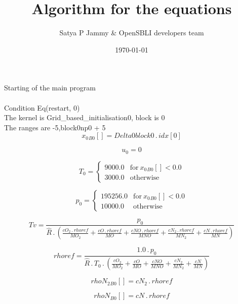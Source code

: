 \documentclass{article}
\title{Algorithm for the equations}
\author{Satya P Jammy \& OpenSBLI developers team}
\date{\today}
\begin{document}
\maketitle
\noindent Starting of the main program\\
\\\noindent Condition Eq(restart, 0)\\\noindent The kernel is Grid_based_initialisation0, block is 0\\\noindent The ranges are -5,block0np0 + 5\\\begin{dmath}{x_{0}{_{B0}}}[{}] = Delta0block0 \,.\, {idx}[{0}]\end{dmath}

\begin{dmath}u_{0} = 0\end{dmath}

\begin{dmath}T_{0} = \begin{cases} 9000.0 & \text{for}\: {x_{0}{_{B0}}}[{}] < 0.0 \\3000.0 & \text{otherwise} \end{cases}\end{dmath}

\begin{dmath}p_{0} = \begin{cases} 195256.0 & \text{for}\: {x_{0}{_{B0}}}[{}] < 0.0 \\10000.0 & \text{otherwise} \end{cases}\end{dmath}

\begin{dmath}Tv = \frac{p_{0}}{\hat{R} \,.\, \left(\frac{cO_{2} \,.\, rhoref}{MO_{2}} + \frac{cO \,.\, rhoref}{MO} + \frac{cNO \,.\, rhoref}{MNO} + \frac{cN_{2} \,.\, rhoref}{MN_{2}} + \frac{cN \,.\, rhoref}{MN}\right)}\end{dmath}

\begin{dmath}rhoref = \frac{1.0 \,.\, p_{0}}{\hat{R} \,.\, T_{0} \,.\, \left(\frac{cO_{2}}{MO_{2}} + \frac{cO}{MO} + \frac{cNO}{MNO} + \frac{cN_{2}}{MN_{2}} + \frac{cN}{MN}\right)}\end{dmath}

\begin{dmath}{rhoN_{2}{_{B0}}}[{}] = cN_{2} \,.\, rhoref\end{dmath}

\begin{dmath}{rhoN{_{B0}}}[{}] = cN \,.\, rhoref\end{dmath}
\end{document}

